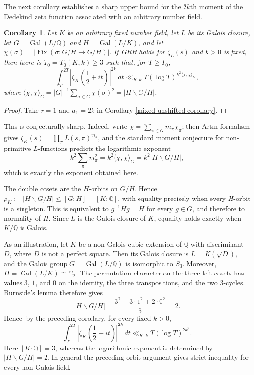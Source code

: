 \documentclass[twoside,reqno,11pt,a4paper]{amsart}
\numberwithin{equation}{section}
\theoremstyle{plain}
\newtheorem{cor}[thm]{Corollary}
\theoremstyle{definition}
\theoremstyle{remark}
\DeclareMathOperator{\Gal}{Gal}
\DeclareMathOperator{\Fix}{Fix}
\renewcommand{\le}{\leqslant}
\renewcommand{\ge}{\geqslant}
\begin{document}
     The next corollary establishes a sharp upper bound for the $2k$th moment of the Dedekind zeta function associated with an arbitrary number field.
            \begin{cor}\label{nongalois-unshifted-corollary}
Let $K$ be an arbitrary fixed number field, let $L$ be its Galois closure, let $G=\Gal(L/\mathbb Q)$ and $H=\Gal(L/K)$, and let $\chi(\sigma)=|\Fix(\sigma:G/H\to G/H)|$. If GRH holds for $\zeta_L(s)$ and $k>0$ is fixed, then there is $T_0=T_0(K,k)\ge3$ such that, for $T\ge T_0$,
\begin{equation*}
        \int_T^{2T}\left|\zeta_K\left(\frac12+it\right)\right|^{2k}\;dt
        \ll_{K,k}
        T(\log T)^{k^2\langle\chi,\chi\rangle_G},
\end{equation*}
where $\langle\chi,\chi\rangle_G=|G|^{-1}\sum_{\sigma\in G}\chi(\sigma)^2=|H\backslash G/H|$.
\end{cor}
\begin{proof}
Take $r=1$ and $a_1=2k$ in Corollary \ref{mixed-unshifted-corollary}.
\end{proof}
This is conjecturally sharp. Indeed, write
$\chi=\sum_{\pi\in\widehat G}m_\pi\chi_\pi$; then Artin formalism
gives $\zeta_K(s)=\prod_\pi L(s,\pi)^{m_\pi}$, and the standard
moment conjecture for non-primitive $L$-functions
\cite[Conjecture~4]{Heap1} predicts the logarithmic exponent
\begin{equation*}
k^2\sum_\pi m_\pi^2
=
k^2\langle\chi,\chi\rangle_G
=
k^2|H\backslash G/H|,
\end{equation*}
which is exactly the exponent obtained here.

The double cosets are the $H$-orbits on $G/H$. Hence
$\rho_K:=|H\backslash G/H|\le[G:H]=[K:\mathbb Q]$, with equality precisely when every $H$-orbit is a singleton. This is equivalent to $g^{-1}Hg=H$ for every $g\in G$, and therefore to normality of $H$. Since $L$ is the Galois closure of $K$, equality holds exactly when $K/\mathbb Q$ is Galois.


As an illustration, let $K$ be a non-Galois cubic extension of $\mathbb{Q}$ with discriminant $D$, where $D$ is not a perfect square. Then its Galois closure is $L=K(\sqrt{D})$, and the Galois group $G=\Gal(L/\mathbb{Q})$ is isomorphic to $S_3$. Moreover,
$H=\Gal(L/K)\cong C_2$. The permutation character on the three left cosets has values $3$, $1$, and $0$ on the identity, the three transpositions, and the two $3$-cycles. Burnside's lemma therefore gives
\begin{equation*}
|H\backslash G/H|=\frac{3^2+3\cdot1^2+2\cdot0^2}{6}=2.
\end{equation*}
Hence, by the preceding corollary, for every fixed $k>0$,
\begin{equation*}
\int_T^{2T}
\left|
\zeta_K\left(\frac12+it\right)
\right|^{2k}\,dt
\ll_{K,k}
T(\log T)^{2k^2}.
\end{equation*}
Here $[K:\mathbb{Q}]=3$, whereas the logarithmic exponent is determined by $|H\backslash G/H|=2$. In general the preceding orbit argument gives strict inequality for every non-Galois field.
\end{document}
